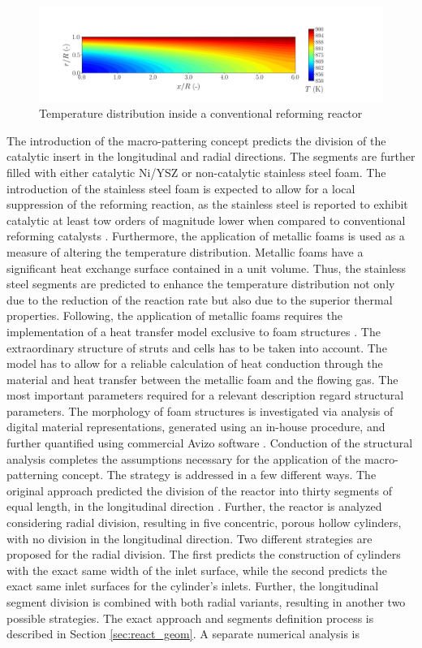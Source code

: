 \documentclass[preprint,12pt]{elsarticle}
\begin{document}
\begin{figure}[h!]
\centering
\includegraphics[width=190mm]{ref-Tfield.png}
\caption{\label{fig:conv_reactor_T}{Temperature distribution inside a conventional reforming reactor}}
\end{figure}

The introduction of the macro-pattering concept predicts the division of the catalytic insert in the longitudinal and radial directions. The segments are further filled with either catalytic Ni/YSZ or non-catalytic stainless steel foam. The introduction of the stainless steel foam is expected to allow for a local suppression of the reforming reaction, as the stainless steel is reported to exhibit catalytic at least tow orders of magnitude lower when compared to conventional reforming catalysts \cite{Munster1981, Cheekatamarla2006}. Furthermore, the application of metallic foams is used as a measure of altering the temperature distribution. Metallic foams have a significant heat exchange surface contained in a unit volume. Thus, the stainless steel segments are predicted to enhance the temperature distribution not only due to the reduction of the reaction rate but also due to the superior thermal properties. Following, the application of metallic foams requires the implementation of a heat transfer model exclusive to foam structures \cite{Dai2010}. The extraordinary structure of struts and cells has to be taken into account. The model has to allow for a reliable calculation of heat conduction through the material and heat transfer between the metallic foam and the flowing gas.  The most important parameters required for a relevant description regard structural parameters. The morphology of foam structures is investigated via analysis of digital material representations, generated using an in-house procedure, and further quantified using commercial Avizo software \cite{Pajak2021IJHEa}. Conduction of the structural analysis completes the assumptions necessary for the application of the macro-patterning concept. The strategy is addressed in a few different ways. The original approach predicted the division of the reactor into thirty segments of equal length, in the longitudinal direction \cite{Pajak2018}. Further, the reactor is analyzed considering radial division, resulting in five concentric, porous hollow cylinders, with no division in the longitudinal direction. Two different strategies are proposed for the radial division. The first predicts the construction of cylinders with the exact same width of the inlet surface, while the second predicts the exact same inlet surfaces for the cylinder's inlets. Further, the longitudinal segment division is combined with both radial variants, resulting in another two possible strategies. The exact approach and segments definition process is described in Section \ref{sec:react_geom}. A separate numerical analysis is 
\end{document}
